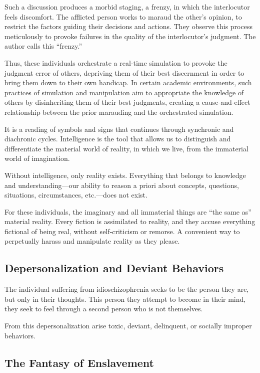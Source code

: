 \documentclass[12pt,oneside]{article}
\begin{document}
Such a discussion produces a morbid staging, a frenzy, in which the interlocutor feels discomfort. The afflicted person works to maraud the other’s opinion, to restrict the factors guiding their decisions and actions. They observe this process meticulously to provoke failures in the quality of the interlocutor’s judgment. The author calls this “frenzy.”

Thus, these individuals orchestrate a real‑time simulation to provoke the judgment error of others, depriving them of their best discernment in order to bring them down to their own handicap. In certain academic environments, such practices of simulation and manipulation aim to appropriate the knowledge of others by disinheriting them of their best judgments, creating a cause‑and‑effect relationship between the prior marauding and the orchestrated simulation.

It is a reading of symbols and signs that continues through synchronic and diachronic cycles. Intelligence is the tool that allows us to distinguish and differentiate the material world of reality, in which we live, from the immaterial world of imagination.

Without intelligence, only reality exists. Everything that belongs to knowledge and understanding—our ability to reason a priori about concepts, questions, situations, circumstances, etc.—does not exist.

For these individuals, the imaginary and all immaterial things are “the same as” material reality. Every fiction is assimilated to reality, and they accuse everything fictional of being real, without self‑criticism or remorse. A convenient way to perpetually harass and manipulate reality as they please.

\subsection{Depersonalization and Deviant Behaviors}

The individual suffering from idioschizophrenia seeks to be the person they are, but only in their thoughts. This person they attempt to become in their mind, they seek to feel through a second person who is not themselves.

From this depersonalization arise toxic, deviant, delinquent, or socially improper behaviors.

\subsection{The Fantasy of Enslavement}
\end{document}
